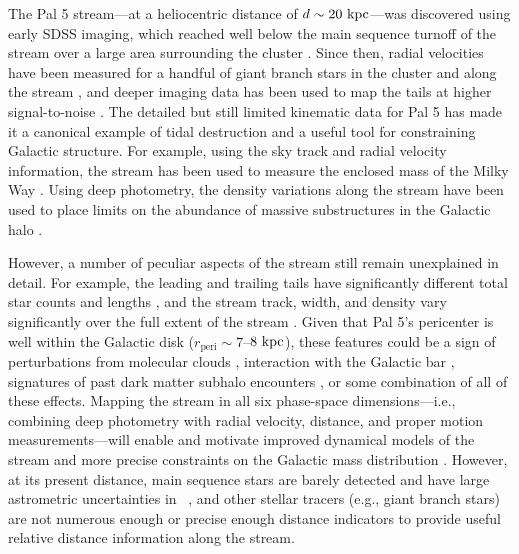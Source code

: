 \documentclass[twocolumn]{aastex63}
\begin{document}
The Pal 5 stream---at a heliocentric distance of $d \sim 20~\mathrm{kpc}$---was discovered using early SDSS imaging, which reached well below the main sequence turnoff of the stream over a large area surrounding the cluster \citep{Odenkirchen:2001, Rockosi:2002}.
Since then, radial velocities have been measured for a handful of giant branch stars in the cluster and along the stream \citep{Odenkirchen:2002, Odenkirchen:2009, Ibata:2017}, and deeper imaging data has been used to map the tails at higher signal-to-noise \citep{Bernard:2016, Ibata:2016, Bonaca:2019}.
The detailed but still limited kinematic data for Pal 5 has made it a canonical example of tidal destruction and a useful tool for constraining Galactic structure.
For example, using the sky track and radial velocity information, the stream has been used to measure the enclosed mass of the Milky Way \citep{Kuepper:2015, Bovy:2016}.
Using deep photometry, the density variations along the stream have been used to place limits on the abundance of massive substructures in the Galactic halo \citep{Erkal:2017}.

However, a number of peculiar aspects of the stream still remain unexplained in detail.
For example, the leading and trailing tails have significantly different total star counts and lengths \citep{Dehnen2004, Bernard:2016}, and the stream track, width, and density vary significantly over the full extent of the stream \citep{Ibata:2016, Bonaca:2019}.
Given that Pal 5's pericenter is well within the Galactic disk ($r_{\textrm{peri}} \sim 7$--$8~\mathrm{kpc}$), these features could be a sign of perturbations from molecular clouds \citep[e.g.,][]{Amorisco:2016}, interaction with the Galactic bar \citep[e.g.,][]{Pearson:2017}, signatures of past dark matter subhalo encounters \citep[e.g.,][]{Erkal:2017}, or some combination of all of these effects.
Mapping the stream in all six phase-space dimensions---i.e., combining deep photometry with radial velocity, distance, and proper motion measurements---will enable and motivate improved dynamical models of the stream and more precise constraints on the Galactic mass distribution \citep[e.g.,][]{PriceWhelan:2013}.
However, at its present distance, main sequence stars are barely detected and have large astrometric uncertainties in \Gaia\ , and other stellar tracers (e.g., giant branch stars) are not numerous enough or precise enough distance indicators to provide useful relative distance information along the stream.
\end{document}

